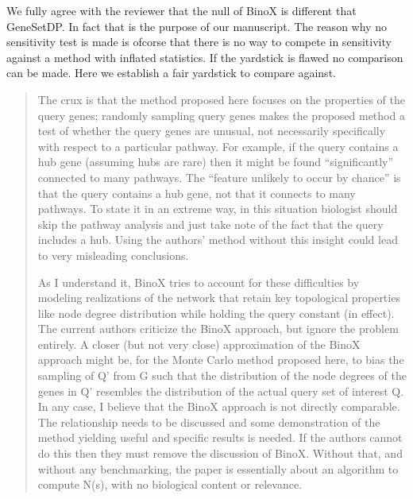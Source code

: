 \documentclass[a4paper]{article}
\newcommand{\breview}{\begin{quotation}\begin{bf}\noindent}
\newcommand{\ereview}{\end{bf}\end{quotation}}
\begin{document}
We fully agree with the reviewer that the null of BinoX is different that GeneSetDP. In fact that is the purpose of our manuscript. The reason why no sensitivity test is made is ofcorse that there is no way to compete in sensitivity against a method with inflated statistics. If the yardstick is flawed no comparison can be made. Here we establish a fair yardstick to compare against.

\breview
The crux is that the method proposed here focuses on the properties of the query genes; randomly sampling query genes makes the proposed method a test of whether the query genes are unusual, not necessarily specifically with respect to a particular pathway. For example, if the query contains a hub gene (assuming hubs are rare) then it might be found “significantly” connected to many pathways. The ``feature unlikely to occur by chance'' is that the query contains a hub gene, not that it connects to many pathways. To state it in an extreme way, in this situation biologist should skip the pathway analysis and just take note of the fact that the query includes a hub. Using the authors’ method without this insight could lead to very misleading conclusions.

\medskip

As I understand it, BinoX tries to account for these difficulties by modeling realizations of the network that retain key topological properties like node degree distribution while holding the query constant (in effect). The current authors criticize the BinoX approach, but ignore the problem entirely. A closer (but not very close) approximation of the BinoX approach might be, for the Monte Carlo method proposed here, to bias the sampling of Q’ from G such that the distribution of the node degrees of the genes in Q’ resembles the distribution of the actual query set of interest Q. In any case, I believe that the BinoX approach is not directly comparable. The relationship needs to be discussed and some demonstration of the method yielding useful and specific results is needed. If the authors cannot do this then they must remove the discussion of BinoX. Without that, and without any benchmarking, the paper is essentially about an algorithm to compute N(s), with no biological content or relevance.

\ereview
\end{document}
